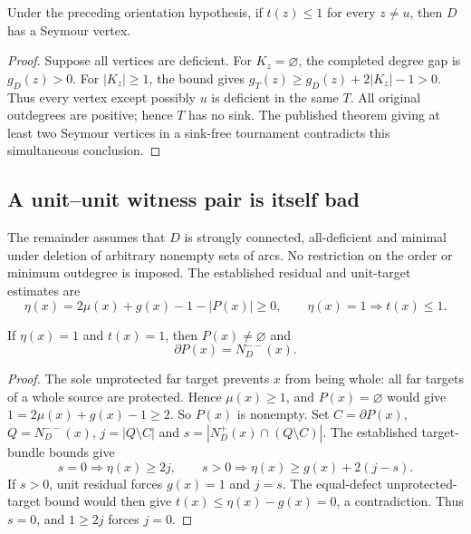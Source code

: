 \begin{corollary}\label{cor:single-blame-unit-others}
Under the preceding orientation hypothesis, if $t(z)\le1$ for every
$z\ne u$, then $D$ has a Seymour vertex.
\end{corollary}
\begin{proof}
Suppose all vertices are deficient.
For $K_z=\varnothing$, the completed degree gap is $g_D(z)>0$.
For $|K_z|\ge1$, the bound gives
$g_T(z)\ge g_D(z)+2|K_z|-1>0$.
Thus every vertex except possibly $u$ is deficient in the same $T$.
All original outdegrees are positive; hence $T$ has no sink.
The published theorem giving at least two Seymour vertices in a
sink-free tournament \cite[Theorem~2]{HavetThomasse2000}
contradicts this simultaneous conclusion.
\end{proof}

\subsection{A unit--unit witness pair is itself bad}

The remainder assumes that $D$ is strongly connected, all-deficient
and minimal under deletion of arbitrary nonempty sets of arcs.
No restriction on the order or minimum outdegree is imposed.
The established residual and unit-target estimates are
\[
 \eta(x)=2\mu(x)+g(x)-1-|P(x)|\ge0,\qquad
 \eta(x)=1\Longrightarrow t(x)\le1.
\]

\begin{lemma}
\label{lem:active-unit-full-boundary}
If $\eta(x)=1$ and $t(x)=1$, then $P(x)\ne\varnothing$ and
\[
 \partial P(x)=N_D^{--}(x).
\]
\end{lemma}
\begin{proof}
The sole unprotected far target prevents $x$ from being whole:
all far targets of a whole source are protected.
Hence $\mu(x)\ge1$, and $P(x)=\varnothing$ would give
$1=2\mu(x)+g(x)-1\ge2$.
So $P(x)$ is nonempty.
Set $C=\partial P(x)$, $Q=N_D^{--}(x)$,
$j=|Q\setminus C|$ and
$s=|N_D^+(x)\cap(Q\setminus C)|$.
The established target-bundle bounds give
\[
 s=0\Rightarrow\eta(x)\ge2j,\qquad
 s>0\Rightarrow\eta(x)\ge g(x)+2(j-s).
\]
If $s>0$, unit residual forces $g(x)=1$ and $j=s$.
The equal-defect unprotected-target bound would then give
$t(x)\le\eta(x)-g(x)=0$, a contradiction.
Thus $s=0$, and $1\ge2j$ forces $j=0$.
\end{proof}

